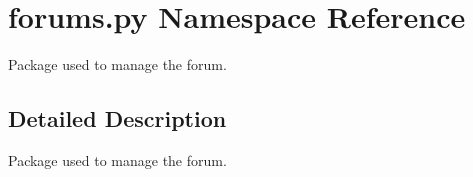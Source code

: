\hypertarget{namespaceforums_1_1py}{}\section{forums.\+py Namespace Reference}
\label{namespaceforums_1_1py}


Package used to manage the forum.  




\subsection{Detailed Description}
Package used to manage the forum. 